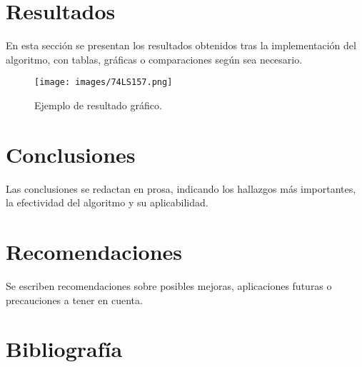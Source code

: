 \documentclass[conference]{IEEEtran}  %
\begin{document}
\section{Resultados}
En esta sección se presentan los resultados obtenidos tras la implementación del algoritmo, con tablas, gráficas o comparaciones según sea necesario.  
\begin{figure}[h]
    \centering
    \texttt{[image: images/74LS157.png]}
    \caption{Ejemplo de resultado gráfico.}
    \label{fig:resultados}
\end{figure}

\section{Conclusiones}
Las conclusiones se redactan en prosa, indicando los hallazgos más importantes, la efectividad del algoritmo y su aplicabilidad.

\section{Recomendaciones}
Se escriben recomendaciones sobre posibles mejoras, aplicaciones futuras o precauciones a tener en cuenta.

\section*{Bibliografía}

\end{document}

